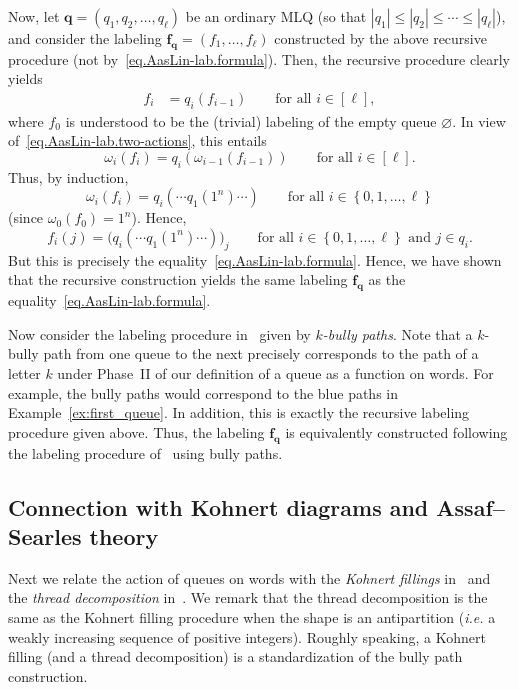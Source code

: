 \documentclass[reqno]{amsart}
\newcommand{\0}{\phantom{c}}
\newcommand{\ff}{\mathbf{f}}
\newcommand{\qq}{\mathbf{q}}
\newenvironment{verlong}{}{}
\newcommand{\set}[1]{\left\{ #1 \right\}}
\newcommand{\abs}[1]{\left| #1 \right|}
\newcommand{\tup}[1]{\left( #1 \right)}
\newcommand{\ive}[1]{\left[ #1 \right]}
\newcommand{\defn}[1]{{\color{darkred}\emph{#1}}} %
\theoremstyle{plain}
\theoremstyle{definition}
\numberwithin{equation}{section}
\newcommand{\Darij}[1]{\todo[size=\tiny,inline,color=red!30]{#1
      \\ \hfill --- Darij}}
\begin{document}
\begin{verlong}
Now, let $\qq = (q_1, q_2, \dotsc, q_{\ell})$ be an ordinary MLQ
(so that $\abs{q_1} \leq \abs{q_2} \leq \cdots \leq \abs{q_{\ell}}$),
and consider the labeling $\ff_\qq = (f_1, \dotsc, f_{\ell})$ constructed by the above recursive procedure
(not by~\eqref{eq.AasLin-lab.formula}).
Then, the recursive procedure clearly yields
\begin{align*}
f_i &= q_i \tup{ f_{i-1} } \qquad \text{for all } i \in \ive{\ell} ,
\end{align*}
where $f_0$ is understood to be the (trivial) labeling of the empty queue $\varnothing$.
In view of~\eqref{eq.AasLin-lab.two-actions}, this entails
\[
\omega_i \tup{ f_i } = q_i \tup{ \omega_{i-1} \tup{ f_{i-1} } } \qquad \text{for all } i \in \ive{\ell} .
\]
Thus, by induction,
\[
\omega_i \tup{ f_i } = q_i( \cdots q_1(1^n) \cdots )
 \qquad \text{for all } i \in \set{0, 1, \dotsc, \ell}
\]
(since $\omega_0 \tup{ f_0 } = 1^n$).
Hence,
\[
f_i(j) = \bigl( q_i( \cdots q_1(1^n) \cdots ) \bigr)_j
 \qquad \text{for all } i \in \set{0, 1, \dotsc, \ell}
        \text{ and } j \in q_i .
\]
But this is precisely the equality~\eqref{eq.AasLin-lab.formula}.
Hence, we have shown that the recursive construction yields the same labeling $\ff_\qq$ as the equality~\eqref{eq.AasLin-lab.formula}.
\end{verlong}

Now consider the labeling procedure in~\cite[\S 2.2]{AasLin17} given by \defn{$k$-bully paths}.
Note that a $k$-bully path from one queue to the next precisely corresponds to the path of a letter $k$ under Phase~II of our definition of a queue as a function on words.
For example, the bully paths would correspond to the blue paths in Example~\ref{ex:first_queue}.
In addition, this is exactly the recursive labeling procedure given above.
Thus, the labeling $\ff_{\qq}$ is equivalently constructed following the labeling procedure of~\cite{AasLin17} using bully paths.





\subsection{Connection with Kohnert diagrams and Assaf--Searles theory}

Next we relate the action of queues on words with the \defn{Kohnert fillings} in~\cite[Def.~2.5]{AssSea18} and the \defn{thread decomposition} in~\cite[Def.~3.5]{AssSea18}.
We remark that the thread decomposition is the same as the Kohnert filling procedure when the shape is an antipartition (\textit{i.e.} a weakly increasing sequence of positive integers).
Roughly speaking, a Kohnert filling (and a thread decomposition) is a standardization of the bully path construction.
\end{document}
